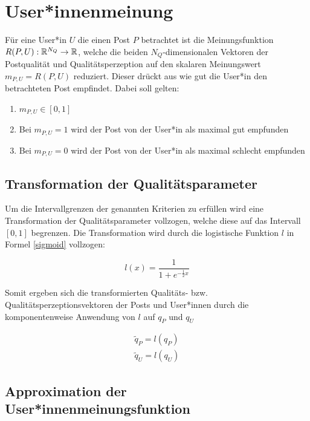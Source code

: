 \chapter{User*innenmeinung}
\label{chapter:bewertungsfunktionen}


Für eine User*in $U$ die einen Post $P$ betrachtet ist die Meinungsfunktion $R(P,U): \mathbb{R}^{N_Q} \rightarrow \mathbb{R}$, welche die beiden $N_Q$-dimensionalen Vektoren der Postqualität und Qualitätsperzeption auf den skalaren Meinungswert $m_{P,U} = R(P,U)$ reduziert. Dieser drückt aus wie gut die User*in den betrachteten Post empfindet. Dabei soll gelten:

\begin{enumerate}
	\item $m_{P,U} \in [0,1]$
	\item Bei $m_{P,U} = 1$ wird der Post von der User*in als maximal gut empfunden
	\item Bei $m_{P,U} = 0$ wird der Post von der User*in als maximal schlecht empfunden
\end{enumerate}

\section{Transformation der Qualitätsparameter}

Um die Intervallgrenzen der genannten Kriterien zu erfüllen wird eine Transformation der Qualitätsparameter vollzogen, welche diese auf das Intervall $[0,1]$ begrenzen. Die Transformation wird durch die logistische Funktion $l$ in Formel \ref{sigmoid} vollzogen:



\begin{equation}
\label{sigmoid}
l(x) = \frac{1}{1 + e^{-\frac{1}{2}x}}
\end{equation}

Somit ergeben sich die transformierten Qualitäts- bzw. Qualitätsperzeptionsvektoren der Posts und User*innen durch die komponentenweise Anwendung von $l$ auf $q_P$ und $q_U$

\begin{align}
\tilde{q}_P = l(q_P) \\
\tilde{q}_U = l(q_U) 
\end{align}

\section{Approximation der User*innenmeinungsfunktion}



